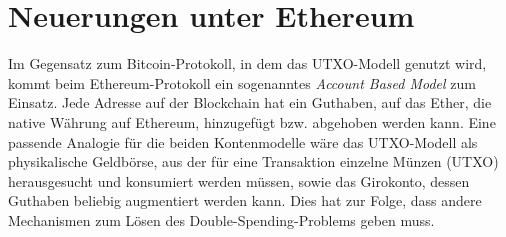 \section{Neuerungen unter Ethereum}
Im Gegensatz zum Bitcoin-Protokoll, in dem das UTXO-Modell genutzt wird, kommt beim Ethereum-Protokoll ein sogenanntes \emph{Account Based Model} zum Einsatz. Jede Adresse auf der Blockchain hat ein Guthaben, auf das Ether, die native Währung auf Ethereum, hinzugefügt bzw. abgehoben werden kann. Eine passende Analogie für die beiden Kontenmodelle wäre das UTXO-Modell als physikalische Geldbörse, aus der für eine Transaktion einzelne Münzen (UTXO) herausgesucht und konsumiert werden müssen, sowie das Girokonto, dessen Guthaben beliebig augmentiert werden kann. Dies hat zur Folge, dass andere Mechanismen zum Lösen des Double-Spending-Problems geben muss.

